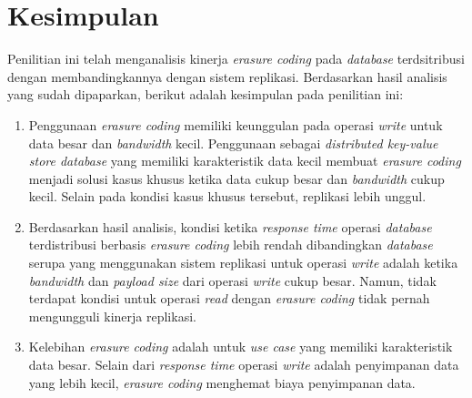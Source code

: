 \section{Kesimpulan}
\label{sec:kesimpulan}

Penilitian ini telah menganalisis kinerja \textit{erasure coding} pada \textit{database} terdsitribusi dengan membandingkannya dengan sistem replikasi. Berdasarkan hasil analisis yang sudah dipaparkan, berikut adalah kesimpulan pada penilitian ini:

\begin{enumerate}
  \item Penggunaan \textit{erasure coding} memiliki keunggulan pada operasi \textit{write} untuk data besar dan \textit{bandwidth} kecil. Penggunaan sebagai \textit{distributed key-value store database} yang memiliki karakteristik data kecil membuat \textit{erasure coding} menjadi solusi kasus khusus ketika data cukup besar dan \textit{bandwidth} cukup kecil. Selain pada kondisi kasus khusus tersebut, replikasi lebih unggul.
  \item Berdasarkan hasil analisis, kondisi ketika \textit{response time} operasi \textit{database} terdistribusi berbasis \textit{erasure coding} lebih rendah dibandingkan \textit{database} serupa yang menggunakan sistem replikasi untuk operasi \textit{write} adalah ketika \textit{bandwidth} dan \textit{payload size} dari operasi \textit{write} cukup besar. Namun, tidak terdapat kondisi untuk operasi \textit{read} dengan \textit{erasure coding} tidak pernah mengungguli kinerja replikasi.
  \item Kelebihan \textit{erasure coding} adalah untuk \textit{use case} yang memiliki karakteristik data besar. Selain dari \textit{response time} operasi \textit{write} adalah penyimpanan data yang lebih kecil, \textit{erasure coding} menghemat biaya penyimpanan data.
\end{enumerate}
